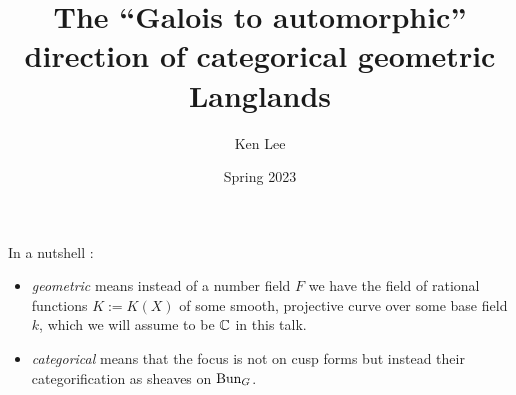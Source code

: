 \documentclass{article}
\begin{document}
\title{The ``Galois to automorphic'' direction of 
  categorical geometric Langlands
}

\author{Ken Lee}
\date{Spring 2023}
\maketitle



\tableofcontents



In a nutshell :
\begin{itemize}
  \item \emph{geometric} means instead of a number field $F$
  we have the field of rational functions $K := K(X)$ of some
  smooth, projective curve over some base field $k$,
  which we will assume to be $\mathbb{C}$ in this talk.
  \item \emph{categorical} means that the focus is not on
  cusp forms but instead their categorification as sheaves on $\operatorname{Bun}_G$.
\end{itemize}
\end{document}
